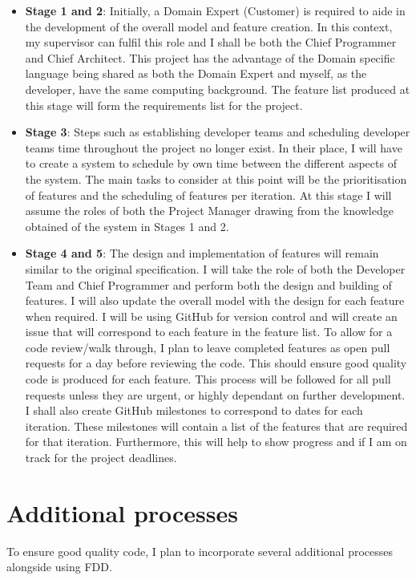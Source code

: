 \documentclass{article}
\begin{document}
\begin{itemize}
	\item \textbf{Stage 1 and 2}: Initially, a Domain Expert (Customer) is required to aide in the development of the overall model and feature creation. In this context, my supervisor can fulfil this role and I shall be both the Chief Programmer and Chief Architect. This project has the advantage of the Domain specific language being shared as both the Domain Expert and myself, as the developer, have the same computing background. The feature list produced at this stage will form the requirements list for the project.

\newpage

	\item \textbf{Stage 3}: Steps such as establishing developer teams and scheduling developer teams time throughout the project no longer exist. In their place, I will have to create a system to schedule by own time between the different aspects of the system. The main tasks to consider at this point will be the prioritisation of features and the scheduling of features per iteration. At this stage I will assume the roles of both the Project Manager drawing from the knowledge obtained of the system in Stages 1 and 2.

	\item \textbf{Stage 4 and 5}: The design and implementation of features will remain similar to the original specification. I will take the role of both the Developer Team and Chief Programmer and perform both the design and building of features. I will also update the overall model with the design for each feature when required. I will be using GitHub for version control and will create an issue that will correspond to each feature in the feature list. To allow for a code review/walk through, I plan to leave completed features as open pull requests for a day before reviewing the code. This should ensure good quality code is produced for each feature. This process will be followed for all pull requests unless they are urgent, or highly dependant on further development. I shall also create GitHub milestones to correspond to dates for each iteration. These milestones will contain a list of the features that are required for that iteration. Furthermore, this will help to show progress and if I am on track for the project deadlines.

\end{itemize}

\section{Additional processes}
To ensure good quality code, I plan to incorporate several additional processes alongside using FDD.
\end{document}
